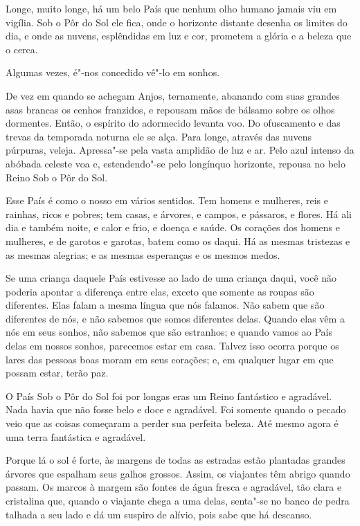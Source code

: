  

Longe, muito longe, há um belo País que nenhum olho humano jamais viu
em vigília. Sob o Pôr do Sol ele fica, onde o horizonte distante desenha
os limites do dia, e onde as nuvens, esplêndidas em luz e cor, prometem
a glória e a beleza que o cerca.

Algumas vezes, é"-nos concedido vê"-lo em sonhos.

De vez em quando se achegam Anjos, ternamente, abanando com suas grandes
asas brancas os cenhos franzidos, e repousam mãos de bálsamo sobre os
olhos dormentes. Então, o espírito do adormecido levanta voo. Do
ofuscamento e das trevas da temporada noturna ele se alça. Para longe,
através das nuvens púrpuras, veleja. Apressa"-se pela vasta amplidão de
luz e ar. Pelo azul intenso da abóbada celeste voa e, estendendo"-se pelo
longínquo horizonte, repousa no belo Reino Sob o Pôr do Sol.

Esse País é como o nosso em vários sentidos. Tem homens e mulheres,
reis e rainhas, ricos e pobres; tem casas, e árvores, e campos, e
pássaros, e flores. Há ali dia e também noite, e calor e frio, e doença
e saúde. Os corações dos homens e mulheres, e de garotos e garotas,
batem como os daqui. Há as mesmas tristezas e as mesmas alegrias; e as
mesmas esperanças e os mesmos medos.

Se uma criança daquele País estivesse ao lado de uma criança daqui, você
não poderia apontar a diferença entre elas, exceto que somente as roupas
são diferentes. Elas falam a mesma língua que nós falamos. Não sabem que
são diferentes de nós, e não sabemos que somos diferentes delas. Quando
elas vêm a nós em seus sonhos, não sabemos que são estranhos; e quando
vamos ao País delas em nossos sonhos, parecemos estar em casa. Talvez
isso ocorra porque os lares das pessoas boas moram em seus corações; e,
em qualquer lugar em que possam estar, terão paz.

O País Sob o Pôr do Sol foi por longas eras um Reino fantástico e
agradável. Nada havia que não fosse belo e doce e agradável. Foi somente
quando o pecado veio que as coisas começaram a perder sua perfeita
beleza. Até mesmo agora é uma terra fantástica e agradável.

Porque lá o sol é forte, às margens de todas as estradas estão plantadas
grandes árvores que espalham seus galhos grossos. Assim, os viajantes
têm abrigo quando passam. Os marcos à margem são fontes de água fresca e
agradável, tão clara e cristalina que, quando o viajante chega a uma
delas, senta"-se no banco de pedra talhada a seu lado e dá um suspiro de
alívio, pois sabe que há descanso.

